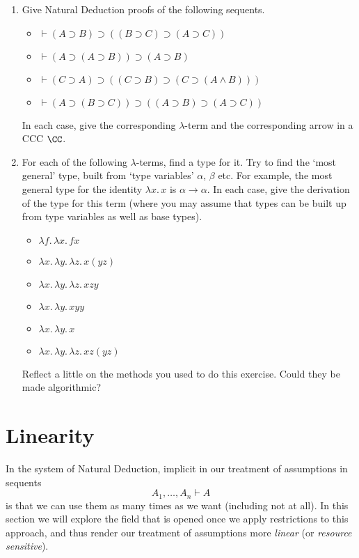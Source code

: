 \documentclass[12pt]{article}
\begin{document}
\begin{enumerate}\renewcommand{\theenumi}{\textbf{\arabic{enumi}}}
  \item Give Natural Deduction proofs of the following sequents.
    \begin{itemize}
    \item $\vdash (A \supset B) \supset ((B \supset C) \supset (A \supset C))$
    \item $\vdash (A \supset (A \supset B)) \supset (A \supset B)$
    \item $\vdash (C \supset A) \supset ((C \supset B) \supset (C \supset (A \wedge B)))$
    \item $\vdash (A \supset (B \supset C)) \supset ((A \supset B) \supset (A \supset C))$
    \end{itemize}
    In each case, give the corresponding $\lambda$-term and the corresponding arrow in a CCC $\CC$.
  \item For each of the following $\lambda$-terms, find a type for it. Try to find the `most general' type, built from `type variables' $\alpha$,
    $\beta$ etc. For example, the most general type for the identity $\lambda x. \, x$ is $\alpha \rightarrow \alpha$.
    In each case, give the derivation of the type for this term (where you may assume that types can be
    built up from type variables as well as base types).
    \begin{itemize}
      \item $\lambda f.\, \lambda x. \, fx$
      \item $ \lambda x. \, \lambda y. \, \lambda z. \, x (yz)$
      \item $ \lambda x . \, \lambda y. \, \lambda z. \, x z y$
      \item $ \lambda x.\, \lambda y.\, x y y$
      \item $ \lambda x.\, \lambda y.\, x$
      \item $ \lambda x. \, \lambda y.\, \lambda z. \, xz (yz)$
    \end{itemize}
    Reflect a little on the methods you used to do this exercise. Could they be made algorithmic?
\end{enumerate}

\section{Linearity}
In the system of Natural Deduction, implicit in our treatment of assumptions in sequents
\[ A_{1}, \ldots , A_{n} \vdash A \]
is that we can use them as many times as we want (including not at all). In this section we will explore the field that is opened once we apply
restrictions to this approach, and thus render our treatment of assumptions more \emph{linear} (or \emph{resource sensitive}).
\end{document}
